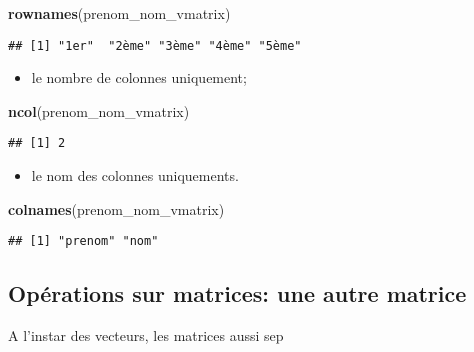 \documentclass[]{book}
\newenvironment{Shaded}{\begin{snugshade}}{\end{snugshade}}
\newcommand{\KeywordTok}[1]{\textcolor[rgb]{0.13,0.29,0.53}{\textbf{#1}}}
\newcommand{\NormalTok}[1]{#1}
\providecommand{\tightlist}{%
  \setlength{\itemsep}{0pt}\setlength{\parskip}{0pt}}
\begin{document}
\begin{Shaded}
\begin{Highlighting}[]
\KeywordTok{rownames}\NormalTok{(prenom_nom_vmatrix)}
\end{Highlighting}
\end{Shaded}

\begin{verbatim}
## [1] "1er"  "2ème" "3ème" "4ème" "5ème"
\end{verbatim}

\begin{itemize}
\tightlist
\item
  le nombre de colonnes uniquement;
\end{itemize}

\begin{Shaded}
\begin{Highlighting}[]
\KeywordTok{ncol}\NormalTok{(prenom_nom_vmatrix)}
\end{Highlighting}
\end{Shaded}

\begin{verbatim}
## [1] 2
\end{verbatim}

\begin{itemize}
\tightlist
\item
  le nom des colonnes uniquements.
\end{itemize}

\begin{Shaded}
\begin{Highlighting}[]
\KeywordTok{colnames}\NormalTok{(prenom_nom_vmatrix)}
\end{Highlighting}
\end{Shaded}

\begin{verbatim}
## [1] "prenom" "nom"
\end{verbatim}

\subsection{Opérations sur matrices: une autre
matrice}\label{operations-sur-matrices-une-autre-matrice}

A l'instar des vecteurs, les matrices aussi sep

\tiny
\end{document}
